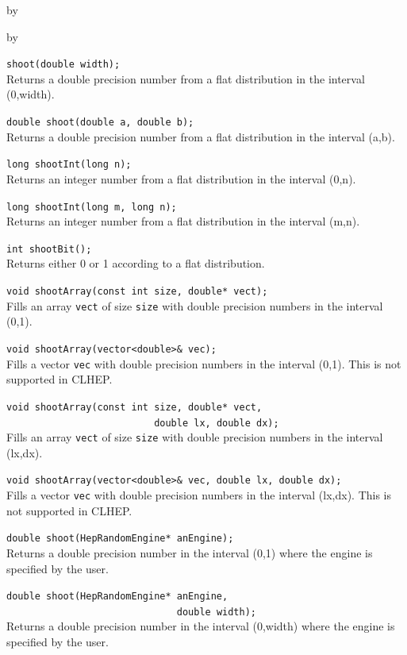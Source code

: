 \documentclass[twoside]{article}
\newcommand{\comp}[1]{\texttt{#1}}%
\newcommand{\entrylabel}[1]{\mbox{\textbf{{#1}}}\hfil}%
\newenvironment{entry}
{\begin{list}{}%
    {\renewcommand{\makelabel}{\entrylabel}%
     \setlength{\labelwidth}{90pt}%
     \setlength{\leftmargin}{\labelwidth}
     \advance\leftmargin by \labelsep%
      }%
    }%
  {\end{list}}
\newcommand{\Entrylabel}[1]%
{\raisebox{0pt}[1ex][0pt]{\makebox[\labelwidth][l]%
    {\parbox[t]{\labelwidth}{\hspace{0pt}\textbf{{#1}}}}}}
\newenvironment{Entry}%
{\renewcommand{\entrylabel}{\Entrylabel}\begin{entry}}%
  {\end{entry}}
\begin{document}
\begin{description}
\begin{Entry}
\begin{Entry}
    \verb+shoot(double width);+\\
    Returns a double precision number from a flat distribution
    in the interval (0,width).
    
    \verb+double shoot(double a, double b);+\\
    Returns a double precision number from a flat distribution
    in the interval (a,b).

    \verb+long shootInt(long n);+\\
    Returns an integer number from a flat distribution
    in the interval (0,n).
    
    \verb+long shootInt(long m, long n);+\\
    Returns an integer number from a flat distribution
    in the interval (m,n).
    
    \verb+int shootBit();+\\
    Returns either 0 or 1 according to a flat distribution.
    
    \verb+void shootArray(const int size, double* vect);+\\
    Fills an array \comp{vect} of size \comp{size} with double
    precision numbers in the interval (0,1).

    \verb+void shootArray(vector<double>& vec);+\\
    Fills a vector \comp{vec} with double
    precision numbers in the interval (0,1).
    This is not supported in CLHEP.

    \verb+void shootArray(const int size, double* vect,+\\
    \verb+                          double lx, double dx);+\\
    Fills an array \comp{vect} of size \comp{size} with double
    precision numbers in the interval (lx,dx).

    \verb+void shootArray(vector<double>& vec, double lx, double dx);+\\
    Fills a vector \comp{vec} with double
    precision numbers in the interval (lx,dx).
    This is not supported in CLHEP.
    
    \verb+double shoot(HepRandomEngine* anEngine);+\\
    Returns a double precision number in the interval (0,1)
    where the engine is specified by the user.
    
    \verb+double shoot(HepRandomEngine* anEngine,+\\
    \verb+                              double width);+\\
    Returns a double precision number in the interval (0,width)
    where the engine is specified by the user.
    

\end{Entry}
\end{Entry}
\end{description}
\end{document}
